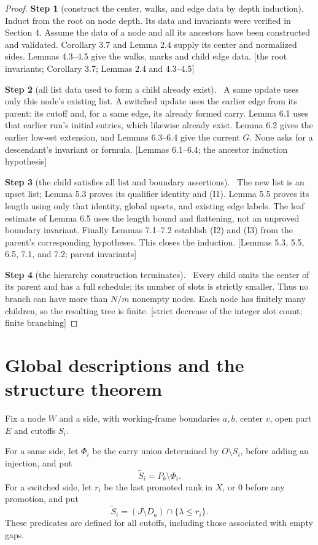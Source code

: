 \documentclass[11pt,a4paper]{article}
\theoremstyle{plain}
\theoremstyle{definition}
\newcommand{\step}[2]{\par\smallskip\noindent\textbf{Step #1} (#2).\ \ignorespaces}
\newcommand{\by}[1]{{\small[#1]}}
\begin{document}
\begin{proof}
\step{1}{construct the center, walks, and edge data by depth induction}
Induct from the root on node depth. Its data and invariants were verified in Section 4. Assume the data of a node and all its ancestors have been constructed and validated. Corollary 3.7 and Lemma 2.4 supply its center and normalized sides. Lemmas 4.3--4.5 give the walks, marks and child edge data.
\by{the root invariants; Corollary 3.7; Lemmas 2.4 and 4.3--4.5}

\step{2}{all list data used to form a child already exist}
A same update uses only this node's existing list. A switched update uses the earlier edge from its parent: its cutoff and, for a same edge, its already formed carry. Lemma 6.1 uses that earlier run's initial entries, which likewise already exist. Lemma 6.2 gives the earlier low-set extension, and Lemmas 6.3--6.4 give the current \(G\). None asks for a descendant's invariant or formula.
\by{Lemmas 6.1--6.4; the ancestor induction hypothesis}

\step{3}{the child satisfies all list and boundary assertions}
The new list is an upset list; Lemma 5.3 proves its qualifier identity and (I1). Lemma 5.5 proves its length using only that identity, global upsets, and existing edge labels. The leaf estimate of Lemma 6.5 uses the length bound and flattening, not an unproved boundary invariant. Finally Lemmas 7.1--7.2 establish (I2) and (I3) from the parent's corresponding hypotheses. This closes the induction.
\by{Lemmas 5.3, 5.5, 6.5, 7.1, and 7.2; parent invariants}

\step{4}{the hierarchy construction terminates}
Every child omits the center of its parent and has a full schedule; its number of slots is strictly smaller. Thus no branch can have more than \(N/m\) nonempty nodes. Each node has finitely many children, so the resulting tree is finite.
\by{strict decrease of the integer slot count; finite branching}
\end{proof}

\section{Global descriptions and the structure theorem}

Fix a node \(W\) and a side, with working-frame boundaries \(a,b\), center \(v\), open part \(E\) and cutoffs \(S_i\).

For a same side, let \(\Phi_i\) be the carry union determined by \(O\setminus S_i\), before adding an injection, and put \[
\widetilde S_i=P_b\setminus\Phi_i.
\tag{8.1}
\] For a switched side, let \(r_i\) be the last promoted rank in \(X\), or \(0\) before any promotion, and put \[
\widetilde S_i=(J\setminus D_a)\cap\{\lambda\leq r_i\}.
\tag{8.2}
\] These predicates are defined for all cutoffs, including those associated with empty gaps.
\end{document}

